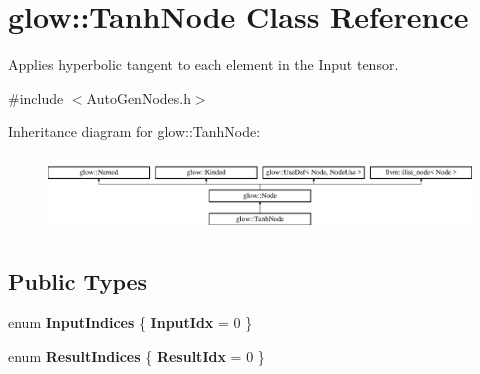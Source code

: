 \hypertarget{classglow_1_1_tanh_node}{}\section{glow\+:\+:Tanh\+Node Class Reference}
\label{classglow_1_1_tanh_node}


Applies hyperbolic tangent to each element in the Input tensor.  




{\ttfamily \#include $<$Auto\+Gen\+Nodes.\+h$>$}

Inheritance diagram for glow\+:\+:Tanh\+Node\+:\begin{figure}[H]
\begin{center}
\leavevmode
\includegraphics[height=2.028986cm]{classglow_1_1_tanh_node}
\end{center}
\end{figure}
\subsection*{Public Types}
\begin{DoxyCompactItemize}
\item 
\mbox{\label{classglow_1_1_tanh_node_ad0bb1520b7df3035d6a739816e8a7a89}} 
enum {\bfseries Input\+Indices} \{ {\bfseries Input\+Idx} = 0
 \}
\item 
\mbox{\label{classglow_1_1_tanh_node_aedd809be363017be0c6a6e509ad33a15}} 
enum {\bfseries Result\+Indices} \{ {\bfseries Result\+Idx} = 0
 \}
\end{DoxyCompactItemize}
